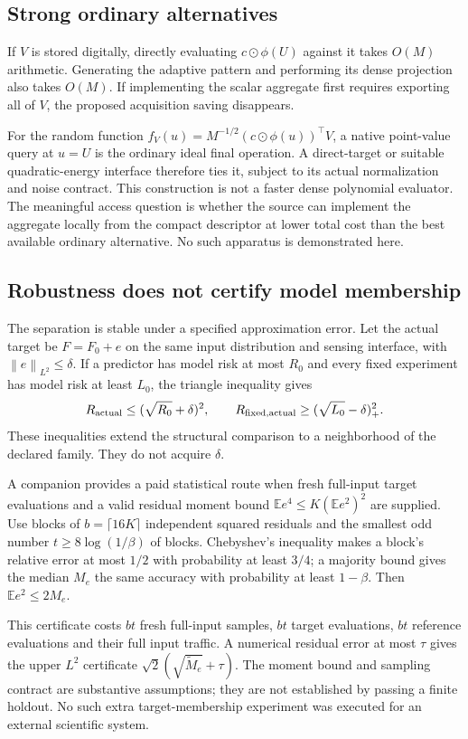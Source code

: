 \documentclass[11pt]{article}
\newcommand{\E}{\mathbb E}
\newcommand{\norm}[1]{\left\lVert#1\right\rVert}
\begin{document}
\subsection{Strong ordinary alternatives}

If $V$ is stored digitally, directly evaluating $c\odot\phi(U)$ against it takes $O(M)$ arithmetic. Generating the adaptive pattern and performing its dense projection also takes $O(M)$. If implementing the scalar aggregate first requires exporting all of $V$, the proposed acquisition saving disappears.

For the random function $f_V(u)=M^{-1/2}(c\odot\phi(u))^\top V$, a native point-value query at $u=U$ is the ordinary ideal final operation. A direct-target or suitable quadratic-energy interface therefore ties it, subject to its actual normalization and noise contract. This construction is not a faster dense polynomial evaluator. The meaningful access question is whether the source can implement the aggregate locally from the compact descriptor at lower total cost than the best available ordinary alternative. No such apparatus is demonstrated here.

\subsection{Robustness does not certify model membership}

The separation is stable under a specified approximation error. Let the actual target be $F=F_0+e$ on the same input distribution and sensing interface, with $\norm e_{L^2}\le\delta$. If a predictor has model risk at most $R_0$ and every fixed experiment has model risk at least $L_0$, the triangle inequality gives
\[
R_{\rm actual}\le(\sqrt{R_0}+\delta)^2,
\qquad
R_{\rm fixed,actual}\ge(\sqrt{L_0}-\delta)_+^2.
\]
These inequalities extend the structural comparison to a neighborhood of the declared family. They do not acquire $\delta$.

A companion provides a paid statistical route when fresh full-input target evaluations and a valid residual moment bound $\E e^4\le K(\E e^2)^2$ are supplied. Use blocks of $b=\lceil16K\rceil$ independent squared residuals and the smallest odd number $t\ge8\log(1/\beta)$ of blocks. Chebyshev's inequality makes a block's relative error at most $1/2$ with probability at least $3/4$; a majority bound gives the median $M_e$ the same accuracy with probability at least $1-\beta$. Then $\E e^2\le2M_e$.

This certificate costs $bt$ fresh full-input samples, $bt$ target evaluations, $bt$ reference evaluations and their full input traffic. A numerical residual error at most $\tau$ gives the upper $L^2$ certificate $\sqrt2(\sqrt{\widetilde M_e}+\tau)$. The moment bound and sampling contract are substantive assumptions; they are not established by passing a finite holdout. No such extra target-membership experiment was executed for an external scientific system.
\end{document}

